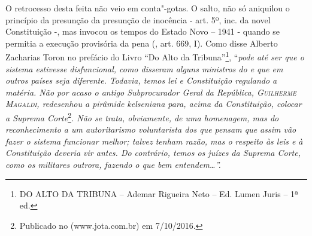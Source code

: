 O retrocesso desta feita não veio em conta"-gotas. O salto, não só
aniquilou o princípio da presunção da presunção de inocência - art. 5º,
inc.  da novel Constituição -, mas invocou os tempos do Estado Novo
-- 1941 - quando se permitia a execução provisória da pena (, art.
669, I). Como disse Alberto Zacharias Toron no prefácio do Livro ``Do
Alto da Tribuna''\footnote{DO ALTO DA TRIBUNA -- Ademar Rigueira Neto --
  Ed. Lumen Juris -- 1ª ed.}, ``\emph{pode até ser que o sistema
estivesse disfuncional, como disseram alguns ministros do  e que em
outros países seja diferente. Todavia, temos lei e Constituição
regulando a matéria. Não por acaso o antigo Subprocurador Geral da
República, \textsc{Guilherme Magaldi}, redesenhou a pirâmide kelseniana
para, acima da Constituição, colocar a Suprema Corte}\footnote{Publicado
  no  (www.jota.com.br) em 7/10/2016.}\emph{. Não se trata,
obviamente, de uma homenagem, mas do reconhecimento a um autoritarismo
voluntarista dos que pensam que assim vão fazer o sistema funcionar
melhor; talvez tenham razão, mas o respeito às leis e à Constituição
deveria vir antes. Do contrário, temos os juízes da Suprema Corte, como
os militares outrora, fazendo o que bem entendem\ldots{}''.}

